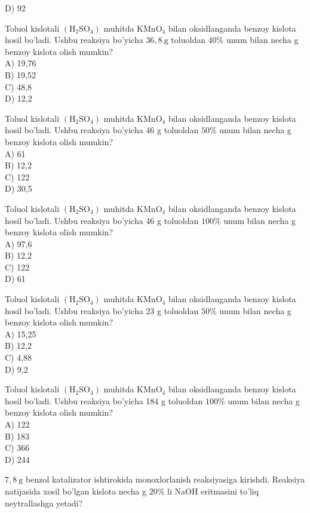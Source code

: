 D) 92
  \item Toluol kislotali $\left(\mathrm{H}_{2} \mathrm{SO}_{4}\right)$ muhitda $\mathrm{KMnO}_{4}$ bilan oksidlanganda benzoy kislota hosil bo'ladi. Ushbu reaksiya bo'yicha $36,8 \mathrm{~g}$ toluoldan $40 \%$ unum bilan necha g benzoy kislota olish mumkin?\\
A) 19,76\\
B) 19,52\\
C) 48,8\\
D) 12,2
  \item Toluol kislotali $\left(\mathrm{H}_{2} \mathrm{SO}_{4}\right)$ muhitda $\mathrm{KMnO}_{4}$ bilan oksidlanganda benzoy kislota hosil bo'ladi. Ushbu reaksiya bo'yicha 46 g toluoldan $50 \%$ unum bilan necha g benzoy kislota olish mumkin?\\
A) 61\\
B) 12,2\\
C) 122\\
D) 30,5
  \item Toluol kislotali $\left(\mathrm{H}_{2} \mathrm{SO}_{4}\right)$ muhitda $\mathrm{KMnO}_{4}$ bilan oksidlanganda benzoy kislota hosil bo'ladi. Ushbu reaksiya bo'yicha 46 g toluoldan $100 \%$ unum bilan necha g benzoy kislota olish mumkin?\\
A) 97,6\\
B) 12,2\\
C) 122\\
D) 61
  \item Toluol kislotali $\left(\mathrm{H}_{2} \mathrm{SO}_{4}\right)$ muhitda $\mathrm{KMnO}_{4}$ bilan oksidlanganda benzoy kislota hosil bo'ladi. Ushbu reaksiya bo'yicha 23 g toluoldan $50 \%$ unum bilan necha g benzoy kislota olish mumkin?\\
A) 15,25\\
B) 12,2\\
C) 4,88\\
D) 9,2
  \item Toluol kislotali $\left(\mathrm{H}_{2} \mathrm{SO}_{4}\right)$ muhitda $\mathrm{KMnO}_{4}$ bilan oksidlanganda benzoy kislota hosil bo'ladi. Ushbu reaksiya bo'yicha 184 g toluoldan $100 \%$ unum bilan necha g benzoy kislota olish mumkin?\\
A) 122\\
B) 183\\
C) 366\\
D) 244
  \item $7,8 \mathrm{~g}$ benzol katalizator ishtirokida monoxlorlanish reaksiyasiga kirishdi. Reaksiya natijasida xosil bo'lgan kislota necha g $20 \%$ li NaOH eritmasini to'liq neytrallashga yetadi?\\

